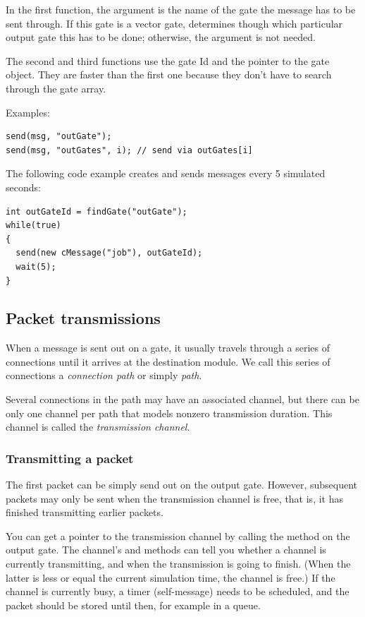 In the first function, the argument  is the name of
the gate the message has to be sent through. If this gate is
a vector gate,  determines though which particular output
gate this has to be done; otherwise, the  argument is not
needed.

The second and third functions use the gate Id and the pointer to the gate
object. They are faster than the first one because they don't have to
search through the gate array.

Examples:

\begin{verbatim}
send(msg, "outGate");
send(msg, "outGates", i); // send via outGates[i]
\end{verbatim}

The following code example creates and sends messages
every 5 simulated seconds:

\begin{verbatim}
int outGateId = findGate("outGate");
while(true)
{
  send(new cMessage("job"), outGateId);
  wait(5);
}
\end{verbatim}


\subsection{Packet transmissions}
\label{sec:simple-modules:packet-transmission}

When a message is sent out on a gate, it usually travels through
a series of connections until it arrives at the destination module.
We call this series of connections a \textit{connection path} or
simply \textit{path}.

Several connections in the path may have an associated channel,
but there can be only one channel per path that models nonzero
transmission duration. This channel is called the
\textit{transmission channel}.

\subsubsection{Transmitting a packet}

The first packet can be simply send out on the output gate. However,
subsequent packets may only be sent when the transmission channel
is free, that is, it has finished transmitting earlier packets.

You can get a pointer to the transmission channel by calling the
 method on the output gate.
The channel's  and 
methods can tell you whether a channel is currently transmitting,
and when the transmission is going to finish. (When the latter is
less or equal the current simulation time, the channel is free.)
If the channel is currently busy, a timer (self-message) needs to
be scheduled, and the packet should be stored until then, for example
in a queue.

